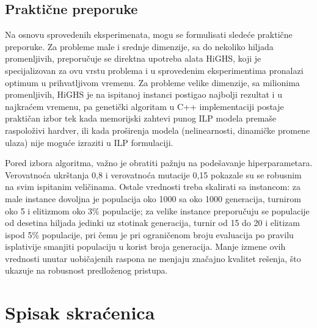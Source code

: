 \documentclass[12pt]{article}
\begin{document}
\subsection{Praktične preporuke}

Na osnovu sprovedenih eksperimenata, mogu se formulisati sledeće praktične preporuke. Za probleme male i srednje dimenzije, sa do nekoliko hiljada promenljivih, preporučuje se direktna upotreba alata HiGHS, koji je specijalizovan za ovu vrstu problema i u sprovedenim eksperimentima pronalazi optimum u prihvatljivom vremenu. Za probleme velike dimenzije, sa milionima promenljivih, HiGHS je na ispitanoj instanci postigao najbolji rezultat i u najkraćem vremenu, pa genetički algoritam u C++ implementaciji postaje praktičan izbor tek kada memorijski zahtevi punog ILP modela premaše raspoloživi hardver, ili kada proširenja modela (nelinearnosti, dinamičke promene ulaza) nije moguće izraziti u ILP formulaciji.

Pored izbora algoritma, važno je obratiti pažnju na podešavanje hiperparametara. Verovatnoća ukrštanja 0,8 i verovatnoća mutacije 0,15 pokazale su se robusnim na svim ispitanim veličinama. Ostale vrednosti treba skalirati sa instancom: za male instance dovoljna je populacija oko 1000 sa oko 1000 generacija, turnirom oko 5 i elitizmom oko 3\% populacije; za velike instance preporučuju se populacije od desetina hiljada jedinki uz stotinak generacija, turnir od 15 do 20 i elitizam ispod 5\% populacije, pri čemu je pri ograničenom broju evaluacija po pravilu isplativije smanjiti populaciju u korist broja generacija. Manje izmene ovih vrednosti unutar uobičajenih raspona ne menjaju značajno kvalitet rešenja, što ukazuje na robusnost predloženog pristupa.

\pagebreak

\printbibliography[title={Literatura},heading=bibintoc]

\pagebreak

\section*{Spisak skraćenica}
\end{document}
